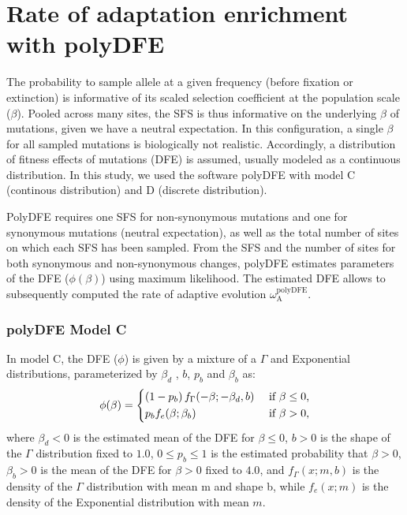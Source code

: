 \documentclass{article}
\newcommand{\rateApop}{\omega_{\mathrm{A}}}
\newcommand{\Spop}{\beta}
\begin{document}
    \pagebreak
    \section{Rate of adaptation enrichment with polyDFE}
    \label{sec:polyDFE}

    The probability to sample allele at a given frequency (before fixation or extinction) is informative of its scaled selection coefficient at the population scale ($\Spop$).
    Pooled across many sites, the SFS is thus informative on the underlying $\Spop$ of mutations, given we have a neutral expectation.
    In this configuration, a single $\Spop$ for all sampled mutations is biologically not realistic.
    Accordingly, a distribution of fitness effects of mutations (DFE) is assumed, usually modeled as a continuous distribution\cite{eyre-walker_distribution_2006, eyre-walker_estimating_2009}.
    In this study, we used the software polyDFE\cite{tataru_inference_2017, tataru_polydfe_2020} with model C (continous distribution) and D (discrete distribution).

    PolyDFE requires one SFS for non-synonymous mutations and one for synonymous mutations (neutral expectation), as well as the total number of sites on which each SFS has been sampled.
    From the SFS and the number of sites for both synonymous and non-synonymous changes, polyDFE estimates parameters of the DFE ($\phi (\Spop)$) using maximum likelihood.
    The estimated DFE allows to subsequently computed the rate of adaptive evolution $\rateApop^{\mathrm{polyDFE}}$.

    \subsubsection*{polyDFE Model C}
    In model C, the DFE ($\phi$) is given by a mixture of a $\Gamma$ and Exponential distributions, parameterized by $\Spop_d$ , $b$, $p_b$
    and $\Spop_b$ as:
    \begin{equation}
        \phi (\Spop) =
        \begin{dcases}
            \left( 1 - p_b \right) f_{\Gamma}(-\Spop; -\Spop_d, b) & \text{ if $\Spop \leq 0$,} \\
            p_b f_{e}(\Spop; \Spop_b) & \text{ if $\Spop > 0$,} \\
        \end{dcases}
    \end{equation}
    where $\Spop_d < 0 $ is the estimated mean of the DFE for $\Spop \leq 0$,
    $b > 0$ is the shape of the $\Gamma$ distribution fixed to $1.0$,
    $0 \leq p_b \leq 1$ is the estimated probability that $\Spop > 0$,
    $\Spop_b > 0$ is the mean of the DFE for $\Spop > 0$ fixed to $4.0$,
    and $f_{\Gamma}(x; m, b)$ is the density of the $\Gamma$ distribution with mean m and shape b, while $f_{e}(x; m)$ is the density of the Exponential distribution with mean $m$.
\end{document}

